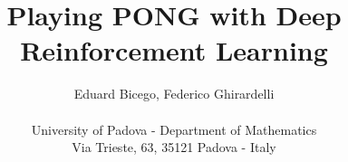 \documentclass[letterpaper]{article} %
\begin{document}
%
\title{Playing PONG with Deep Reinforcement Learning}

\author{Eduard Bicego, Federico Ghirardelli\\\\
University of Padova - Department of Mathematics\\
Via Trieste, 63, 35121 Padova - Italy\\
}

\maketitle







%

\end{document}
